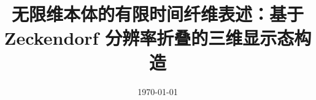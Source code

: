 \documentclass[11pt,letterpaper]{ctexart}
\title{无限维本体的有限时间纤维表述：基于 Zeckendorf 分辨率折叠的三维显示态构造}
\author{}
\date{\today}
\begin{document}
\maketitle























\FloatBarrier
\appendix


\FloatBarrier

\end{document}
